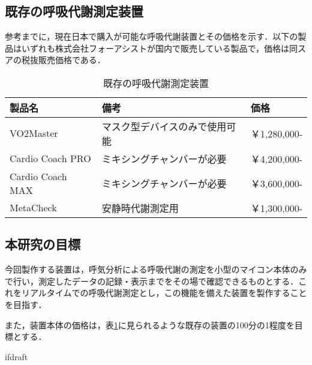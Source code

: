\subsection{既存の呼吸代謝測定装置}

参考までに，現在日本で購入が可能な呼吸代謝装置とその価格を示す．以下の製品はいずれも株式会社フォーアシストが国内で販売している製品で，価格は同スアの税抜販売価格である．

\begin{table}[]
\begin{center}
  \caption{既存の呼吸代謝測定装置}
  \label{tb:existing_rmmd}
  \begin{tabular}{|l|l|l|}
  \hline
  製品名              & 備考              & 価格          \\ \hline
  VO2Master        & マスク型デバイスのみで使用可能 & ￥1,280,000- \\ \hline
  Cardio Coach PRO & ミキシングチャンバーが必要   & ￥4,200,000- \\ \hline
  Cardio Coach MAX & ミキシングチャンバーが必要   & ￥3,600,000- \\ \hline
  MetaCheck        & 安静時代謝測定用        & ￥1,300,000- \\ \hline
  \end{tabular}
\end{center}
\end{table}

\subsection{本研究の目標}

今回製作する装置は，呼気分析による呼吸代謝の測定を小型のマイコン本体のみで行い，測定したデータの記録・表示までをその場で確認できるものとする．これをリアルタイムでの呼吸代謝測定とし，この機能を備えた装置を製作することを目指す．

また，装置本体の価格は，表\ref{tb:existing_rmmd}に見られるような既存の装置の100分の1程度を目標とする．


\expandafter\ifx\csname ifdraft\endcsname\relax
  
\fi
